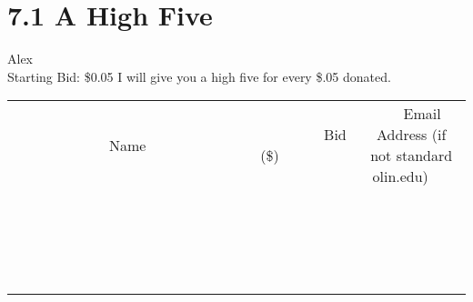 \documentclass[11pt]{article}
\begin{document}
\section*{7.1 A High Five}
Alex
\\
Starting Bid: \$0.05
\newline
I will give you a high five for every \$.05 donated.
\\[3ex]
\begin{tabular}{c c c}
~~~~~~~~~~~~~Name~~~~~~~~~~~~~ & ~~~~~~~~~Bid (\$)~~~~~~~~~  & ~~~Email Address (if not standard olin.edu)~~~\\
 & & \\
\hline
 & & \\
\hline
 & & \\
\hline
 & & \\
\hline
 & & \\
\hline
 & & \\
\hline
 & & \\
\hline
 & & \\
\hline
 & & \\
\hline
 & & \\
\hline
 & & \\
\hline
 & & \\
\hline
 & & \\
\hline
 & & \\
\hline
 & & \\
\hline
 & & \\
\hline
 & & \\
\hline
 & & \\
\hline
 & & \\
\hline
\end{tabular}
\newpage
\end{document}
